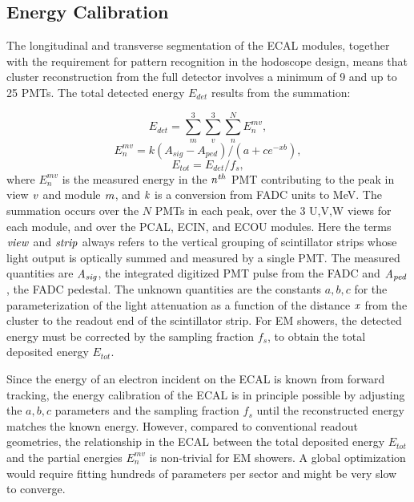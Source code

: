 \subsection{Energy Calibration}

The longitudinal and transverse segmentation of the ECAL modules, together with the requirement for pattern
recognition in the hodoscope design, means that cluster reconstruction from the full detector involves a minimum
of 9 and up to 25 PMTs. The total detected energy $E_{det}$ results from the summation:

\begin{equation}
 E_{det} = \sum_{m}^{3} \sum_{v}^{3} \sum_{n}^{N} E_{n}^{mv},\label{eq:E1}
\end{equation}
\begin{equation}
 E_{n}^{mv} = k(A_{sig}-A_{ped})/(a+c e^{-xb}),   \label{eq:E2}
\end{equation}
\begin{equation}
 E_{tot} = E_{det}/f_{s},                 \label{eq:E3}
\end{equation}
where $E_{n}^{mv}$ is the measured energy in the ${\it n^{th}}$ PMT contributing to the peak in view ${\it v}$ and
module ${\it m}$, and ${\it k}$ is a conversion from FADC units to MeV. The summation occurs over the $N$ PMTs
in each peak, over the 3 U,V,W views for each module, and over the PCAL, ECIN, and ECOU modules. Here the
terms ${\it view}$ and ${\it strip}$ always refers to the vertical grouping of scintillator strips whose light output
is optically summed and measured by a single PMT. The measured quantities are ${\it A_{sig}}$, the integrated
digitized PMT pulse from the FADC and ${\it A_{ped}}$, the FADC pedestal. The unknown quantities are the
constants $a,b,c$ for the parameterization of the light attenuation as a function of the distance ${\it x}$ from the
cluster to the readout end of the scintillator strip. For EM showers, the detected energy must be corrected by the
sampling fraction $f_{s}$, to obtain the total deposited energy $E_{tot}$.  

Since the energy of an electron incident on the ECAL is known from forward tracking, the energy calibration of
the ECAL is in principle possible by adjusting the $a,b,c$ parameters and the sampling fraction $f_{s}$ until the
reconstructed energy matches the known energy. However, compared to conventional readout geometries, the
relationship in the ECAL between the total deposited energy $E_{tot}$ and the partial energies $E_{n}^{mv}$ is
non-trivial for EM showers. A global optimization would require fitting hundreds of parameters per sector and
might be very slow to converge.

